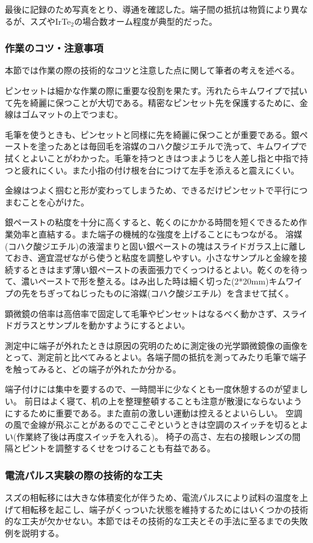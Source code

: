 最後に記録のため写真をとり、導通を確認した。端子間の抵抗は物質により異なるが、スズやIrTe$_2$の場合数オーム程度が典型的だった。
 
\subsubsection{作業のコツ・注意事項} 
本節では作業の際の技術的なコツと注意した点に関して筆者の考えを述べる。

ピンセットは細かな作業の際に重要な役割を果たす。汚れたらキムワイプで拭いて先を綺麗に保つことが大切である。精密なピンセット先を保護するために、金線はゴムマットの上でつまむ。
 
毛筆を使うときも、ピンセットと同様に先を綺麗に保つことが重要である。銀ペーストを塗ったあとは毎回毛を溶媒のコハク酸ジエチルで洗って、キムワイプで拭くとよいことがわかった。毛筆を持つときはつまようじを人差し指と中指で持つと疲れにくい。また小指の付け根を台につけて左手を添えると震えにくい。

金線はつよく掴むと形が変わってしまうため、できるだけピンセットで平行につまむことを心がけた。

銀ペーストの粘度を十分に高くすると、乾くのにかかる時間を短くできるため作業効率と直結する。また端子の機械的な強度を上げることにもつながる。
溶媒(コハク酸ジエチル)の液溜まりと固い銀ペーストの塊はスライドガラス上に離しておき、適宜混ぜながら使うと粘度を調整しやすい。小さなサンプルと金線を接続するときはまず薄い銀ペーストの表面張力でくっつけるとよい。乾くのを待って、濃いペーストで形を整える。はみ出した時は細く切った(2*20mm)キムワイプの先をちぎってねじったものに溶媒(コハク酸ジエチル）を含ませて拭く。

顕微鏡の倍率は高倍率で固定して毛筆やピンセットはなるべく動かさず、スライドガラスとサンプルを動かすようにするとよい。

測定中に端子が外れたときは原因の究明のために測定後の光学顕微鏡像の画像をとって、測定前と比べてみるとよい。各端子間の抵抗を測ってみたり毛筆で端子を触ってみると、どの端子が外れたか分かる。

端子付けには集中を要するので、一時間半に少なくとも一度休憩するのが望ましい。
前日はよく寝て、机の上を整理整頓することも注意が散漫にならないようにするために重要である。また直前の激しい運動は控えるとよいらしい。
空調の風で金線が飛ぶことがあるのでここぞというときは空調のスイッチを切るとよい(作業終了後は再度スイッチを入れる)。 椅子の高さ、左右の接眼レンズの間隔とピントを調整するくせをつけることも有益である。

\subsubsection{電流パルス実験の際の技術的な工夫} 
スズの相転移には大きな体積変化が伴うため、電流パルスにより試料の温度を上げて相転移を起こし、端子がくっついた状態を維持するためにはいくつかの技術的な工夫が欠かせない。本節ではその技術的な工夫とその手法に至るまでの失敗例を説明する。

